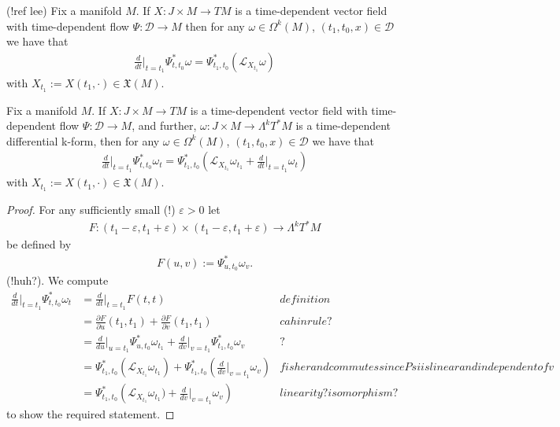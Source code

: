 \begin{proposition}
(!ref lee)
Fix a manifold $M$. If $X : J \times M \to TM$ is a time-dependent vector field with time-dependent flow $\Psi: \mathcal{D} \to M$ then for any $\omega \in \Omega^k(M)$, $(t_1,t_0,x) \in \mathcal{D}$ we have that
\begin{align*}
\frac{d}{dt} \bigg\vert_{t=t_1} \Psi^*_{t,t_0} \omega = \Psi^*_{t_1,t_0} \left( \mathcal{L}_{X_{t_1}} \omega \right)
\end{align*}
with $X_{t_1} := X(t_1, \cdot) \in \mathfrak{X}(M)$.
\end{proposition}

\begin{proposition}
Fix a manifold $M$. If $X : J \times M \to TM$ is a time-dependent vector field with time-dependent flow $\Psi: \mathcal{D} \to M$, and further, $\omega : J \times M \to \Lambda^k T^* M$ is a time-dependent differential k-form, then for any $\omega \in \Omega^k(M)$, $(t_1,t_0,x) \in \mathcal{D}$ we have that
\begin{align*}
\frac{d}{dt} \bigg\vert_{t=t_1} \Psi^*_{t,t_0} \omega_t = \Psi^*_{t_1,t_0} \left( \mathcal{L}_{X_{t_1}} \omega_{t_1} + \frac{d}{dt} \bigg\vert_{t=t_1} \omega_t \right)
\end{align*}
with $X_{t_1} := X(t_1, \cdot) \in \mathfrak{X}(M)$.
\end{proposition}

\begin{proof}
For any sufficiently small (!) $\varepsilon > 0$ let
\begin{align*}
F:(t_1-\varepsilon,t_1+\varepsilon)\times(t_1-\varepsilon,t_1+\varepsilon) \to \Lambda^k T^*M
\end{align*}
be defined by
\begin{align*}
F(u,v) := \Psi^*_{u,t_0}\omega_v .
\end{align*}
(!huh?). We compute
\begin{align*}
\frac{d}{dt}\bigg\vert_{t=t_1} \Psi^*_{t,t_0} \omega_t &= \frac{d}{dt}\bigg\vert_{t=t_1} F(t,t) & definition \\
&= \frac{\partial F}{\partial u}(t_1,t_1) + \frac{\partial F}{\partial v} (t_1,t_1) &cahin rule? \\
&= \frac{d}{du}\bigg\vert_{u=t_1} \Psi^*_{u,t_0} \omega_{t_1} + \frac{d}{dv} \bigg\vert_{v=t_1} \Psi^*_{t_1,t_0} \omega_v &? \\
&= \Psi^*_{t_1,t_0} (\mathcal{L}_{X_{t_1}} \omega_{t_1}) + \Psi^*_{t_1,t_0} \left( \frac{d}{dv}\bigg\vert_{v=t_1} \omega_v \right) & fisher and commutes since Psi is linear and independent of v \\
&=  \Psi^*_{t_1,t_0} \left( \mathcal{L}_{X_{t_1}} \omega_{t_1}) +  \frac{d}{dv}\bigg\vert_{v=t_1} \omega_v \right) & linearity? isomorphism?
\end{align*}
to show the required statement.
\end{proof}

